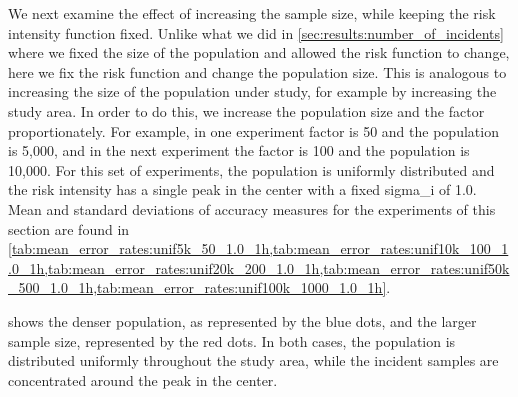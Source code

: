 We next examine the effect of increasing the sample size, while keeping the risk intensity function fixed.
Unlike what we did in \cref{sec:results:number_of_incidents} where we fixed the size of the population and allowed the risk function to change,
here we fix the risk function and change the population size.
This is analogous to increasing the size of the population under study, for example by increasing the study area.
In order to do this, we increase the population size and the \gls{factor} proportionately.
For example, in one experiment \gls{factor} is 50 and the population is 5,000,
and in the next experiment the \gls{factor} is 100 and the population is 10,000.
For this set of experiments, the population is uniformly distributed and the risk intensity has a single peak in the center with a fixed \gls{sigma_i} of 1.0.
Mean and standard deviations of accuracy measures for the experiments of this section are found in \cref{tab:mean_error_rates:unif5k_50_1.0_1h,tab:mean_error_rates:unif10k_100_1.0_1h,tab:mean_error_rates:unif20k_200_1.0_1h,tab:mean_error_rates:unif50k_500_1.0_1h,tab:mean_error_rates:unif100k_1000_1.0_1h}.

 shows the denser population, as represented by the blue dots, and the larger sample size, represented by the red dots.
In both cases, the population is distributed uniformly throughout the study area,
while the incident samples are concentrated around the peak in the center.

